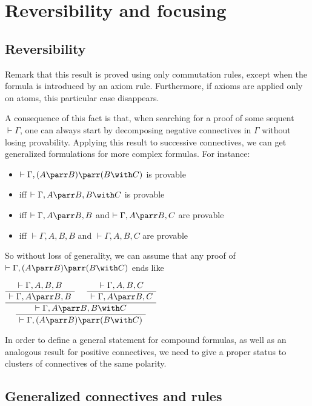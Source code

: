 \section{Reversibility and focusing}\label{reversibility-and-focusing}

\subsection{Reversibility}\label{reversibility}

Remark that this result is proved using only commutation rules, except
when the formula is introduced by an axiom rule. Furthermore, if axioms
are applied only on atoms, this particular case disappears.

A consequence of this fact is that, when searching for a proof of some
sequent \(\vdash\Gamma\), one can always start by decomposing negative
connectives in \(\Gamma\) without losing provability. Applying this
result to successive connectives, we can get generalized formulations
for more complex formulas. For instance:

\begin{itemize}
\tightlist
\item
  \(\vdash\Gamma,(A\parr B)\parr(B\with C)\) is provable
\item
  iff \(\vdash\Gamma,A\parr B,B\with C\) is provable
\item
  iff \(\vdash\Gamma,A\parr B,B\) and \(\vdash\Gamma,A\parr B,C\) are
  provable
\item
  iff \(\vdash\Gamma,A,B,B\) and \(\vdash\Gamma,A,B,C\) are provable
\end{itemize}

So without loss of generality, we can assume that any proof of
\(\vdash\Gamma,(A\parr B)\parr(B\with C)\) ends like

\(\AxRule{ \vdash \Gamma, A, B, B }
  \UnaRule{ \vdash \Gamma, A\parr B, B }
  \AxRule{ \vdash \Gamma, A, B, C }
  \UnaRule{ \vdash \Gamma, A\parr B, C }
  \BinRule{ \vdash \Gamma, A\parr B, B\with C }
  \UnaRule{ \vdash \Gamma, (A\parr B)\parr(B\with C) }
  \DisplayProof\)

In order to define a general statement for compound formulas, as well as
an analogous result for positive connectives, we need to give a proper
status to clusters of connectives of the same polarity.

\subsection{Generalized connectives and
rules}\label{generalized-connectives-and-rules}

